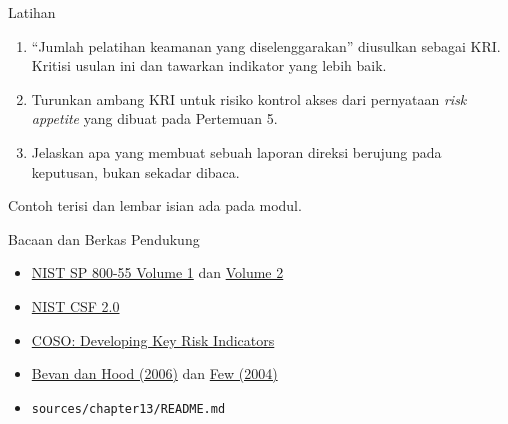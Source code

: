 \documentclass[aspectratio=169, table, 12pt]{beamer}
\begin{document}
\begin{frame}{{\Large Latihan}}
  \vspace{4pt}
  \small
  \begin{enumerate}
    \item ``Jumlah pelatihan keamanan yang diselenggarakan'' diusulkan sebagai KRI. Kritisi usulan
          ini dan tawarkan indikator yang lebih baik.
    \item Turunkan ambang KRI untuk risiko kontrol akses dari pernyataan \textit{risk appetite}
          yang dibuat pada Pertemuan 5.
    \item Jelaskan apa yang membuat sebuah laporan direksi berujung pada keputusan, bukan sekadar
          dibaca.
  \end{enumerate}

  \vspace{6pt}
  Contoh terisi dan lembar isian ada pada modul.
\end{frame}

\begin{frame}{{\Large Bacaan dan Berkas Pendukung}}
  \vspace{6pt}
  \small
  \begin{itemize}
    \item \href{https://doi.org/10.6028/NIST.SP.800-55v1}{NIST SP 800-55 Volume 1} dan
          \href{https://doi.org/10.6028/NIST.SP.800-55v2}{Volume 2}
    \item \href{https://doi.org/10.6028/NIST.CSWP.29}{NIST CSF 2.0}
    \item \href{https://www.coso.org/_files/ugd/3059fc_6b2928dffbdf481dbf32971b3e9b9c85.pdf}{COSO:
          Developing Key Risk Indicators}
    \item \href{https://doi.org/10.1111/j.1467-9299.2006.00600.x}{Bevan dan Hood (2006)} dan
          \href{https://www.perceptualedge.com/articles/ie/dashboard_confusion.pdf}{Few (2004)}
    \item \texttt{sources/chapter13/README.md}
  \end{itemize}
\end{frame}
\end{document}

